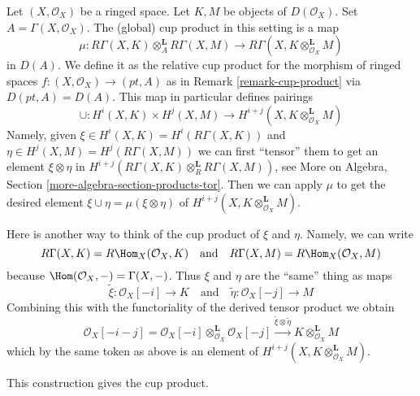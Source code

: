 \noindent
Let $(X, \mathcal{O}_X)$ be a ringed space. Let $K, M$ be objects
of $D(\mathcal{O}_X)$. Set $A = \Gamma(X, \mathcal{O}_X)$.
The (global) cup product in this setting is a map
$$
\mu :
R\Gamma(X, K) \otimes_A^\mathbf{L} R\Gamma(X, M)
\longrightarrow
R\Gamma(X, K \otimes_{\mathcal{O}_X}^\mathbf{L} M)
$$
in $D(A)$. We define it as the relative cup product for the
morphism of ringed spaces $f : (X, \mathcal{O}_X) \to (pt, A)$
as in Remark \ref{remark-cup-product} via $D(pt, A) = D(A)$.
This map in particular defines pairings
$$
\cup :
H^i(X, K) \times H^j(X, M)
\longrightarrow
H^{i + j}(X, K \otimes_{\mathcal{O}_X}^\mathbf{L} M)
$$
Namely, given $\xi \in H^i(X, K) = H^i(R\Gamma(X, K))$ and
$\eta \in H^j(X, M) = H^j(R\Gamma(X, M))$ we can
first ``tensor'' them to get an element $\xi \otimes \eta$ in
$H^{i + j}(R\Gamma(X, K) \otimes_R^\mathbf{L} R\Gamma(X, M))$, see
More on Algebra, Section \ref{more-algebra-section-products-tor}.
Then we can apply $\mu$ to get the desired element
$\xi \cup \eta = \mu(\xi \otimes \eta)$
of $H^{i + j}(X, K \otimes_{\mathcal{O}_X}^\mathbf{L} M)$.

\medskip\noindent
Here is another way to think of the cup product of $\xi$ and $\eta$.
Namely, we can write
$$
R\Gamma(X, K) = R\Hom_X(\mathcal{O}_X, K)
\quad\text{and}\quad
R\Gamma(X, M) = R\Hom_X(\mathcal{O}_X, M)
$$
because $\Hom(\mathcal{O}_X, -) = \Gamma(X, -)$.
Thus $\xi$ and $\eta$ are the ``same'' thing as maps
$$
\tilde \xi : \mathcal{O}_X[-i] \to K
\quad\text{and}\quad
\tilde \eta : \mathcal{O}_X[-j] \to M
$$
Combining this with the functoriality of the derived tensor product
we obtain
$$
\mathcal{O}_X[-i - j] =
\mathcal{O}_X[-i] \otimes_{\mathcal{O}_X}^\mathbf{L} \mathcal{O}_X[-j]
\xrightarrow{\tilde \xi \otimes \tilde \eta}
K \otimes_{\mathcal{O}_X}^\mathbf{L} M
$$
which by the same token as above is an element of
$H^{i + j}(X, K \otimes_{\mathcal{O}_X}^\mathbf{L} M)$.

\begin{lemma}
\label{lemma-second-cup-equals-first}
This construction gives the cup product.
\end{lemma}

